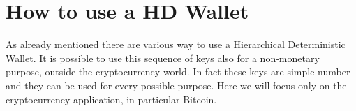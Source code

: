 
\chapter{How to use a HD Wallet} %

\label{bip32} %



As already mentioned there are various way to use a Hierarchical Deterministic Wallet. It is possible to use this sequence of keys also for a non-monetary purpose, outside the cryptocurrency world. In fact these keys are simple number and they can be used for every possible purpose. Here we will focus only on the cryptocurrency application, in particular Bitcoin.

